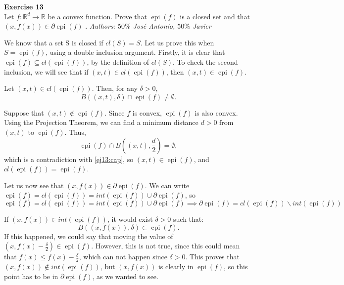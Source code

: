\documentclass[11pt,table]{article}
\newenvironment{problem}[2][Exercise]
{ \begin{mdframed}[backgroundcolor=gray!20] \textbf{#1 #2} \\}
	{\hspace{0.0cm}\newline\newline \emph{Authors: \(50\%\) José Antonio, \(50\%\) Javier}  \end{mdframed}}
\begin{document}
	
	\begin{problem}{13}
		Let \( f : \mathbb{R}^d \to \mathbb{R} \) be a convex function. Prove that \( \operatorname{epi}(f) \) is a closed set and that \( (x, f(x)) \in \partial \operatorname{epi}(f) \)  .
	\end{problem}
	
	We know that a set S is closed if \(cl(S) = S\). Let us prove this when \(S = \operatorname{epi}(f)\), using a double inclusion argument. Firstly, it is clear that $\operatorname{epi}(f) \subseteq cl(\operatorname{epi}(f))$, by the definition of \(cl(S)\). To check the second inclusion, we will see that if \((x,t)\in cl(\operatorname{epi}(f))\), then \((x,t) \in \operatorname{epi}(f)\).
	
	Let \((x,t)\in cl(\operatorname{epi}(f))\). Then, for any \(\delta > 0\),
	\begin{equation}\label{ej13:cap}
		B((x,t),\delta) \cap 	\operatorname{epi}(f) \neq \emptyset.
	\end{equation}
	
	Suppose that \((x,t)\notin \operatorname{epi}(f)\). Since \(f\) is convex, \(\operatorname{epi}(f)\) is also convex. Using the Projection Theorem, we can find a minimum distance \(d > 0\) from \((x,t)\) to \(\operatorname{epi}(f)\). Thus,
	\[
	\operatorname{epi}(f) \cap B((x,t), \frac{d}{2}) = \emptyset,
	\]
	which is a contradiction with \eqref{ej13:cap}, so \((x,t) \in \operatorname{epi}(f)\), and \(cl(\operatorname{epi}(f)) = \operatorname{epi}(f)\).
	
	Let us now see that \((x,f(x)) \in \partial \operatorname{epi}(f)\). We can write \(\operatorname{epi}(f) = cl(\operatorname{epi}(f)) = int(\operatorname{epi}(f)) \cup \partial \operatorname{epi}(f)\), so
	\[
	\operatorname{epi}(f) = cl(\operatorname{epi}(f)) = int(\operatorname{epi}(f)) \cup \partial \operatorname{epi}(f)	\implies \partial \operatorname{epi}(f) = cl(\operatorname{epi}(f)) \backslash int(\operatorname{epi}(f))
	\]
	
	If \((x,f(x)) \in int(\operatorname{epi}(f))\), it would exist \(\delta > 0\) such that:
	\[
	B((x,f(x)),\delta) \subset \operatorname{epi}(f).
	\]
	If this happened, we could say that moving the value of  \((x,f(x)- \frac{\delta}{2}) \in \operatorname{epi}(f) \). However, this is not true, since this could mean that \(f(x) \leq f(x) - \frac{\delta}{2}\), which can not happen since \(\delta > 0\). This proves that \((x,f(x))\notin int(\operatorname{epi}(f))\), but \((x,f(x))\) is clearly in \(\operatorname{epi}(f)\), so this point has to be in \(\partial \operatorname{epi}(f)\), as we wanted to see.
	
\end{document}

